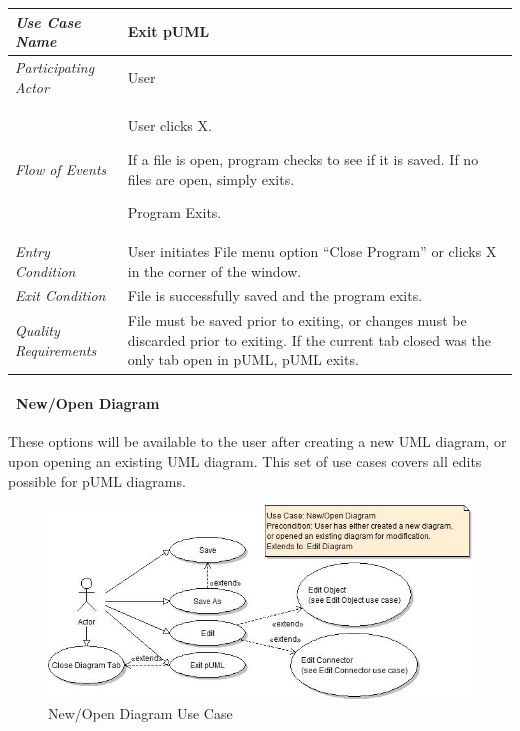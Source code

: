 \documentclass[twoside,letterpaper]{article}
\newenvironment{my_enumerate}{
\begin{enumerate}
  \setlength{\itemsep}{1pt}
  \setlength{\parskip}{0pt}
  \setlength{\parsep}{0pt}}{\end{enumerate}
}
\begin{document}
\begin{flushleft}
\tablehead{}
\begin{tabular}{|m{2.0in} m{5.0in}|}
\hline
{\bfseries\emph{Use Case Name}}
& {\bfseries Exit pUML}
\\\hline
\emph{Participating Actor}
& User
\\\hline
\emph{Flow of Events}
& \begin{my_enumerate}
\item User clicks X.
\item If a file is open, program checks to see if it is saved.  If no files are open, simply exits.
\item Program Exits.
\end{my_enumerate}
\\\hline
\emph{Entry Condition}
&
User initiates File menu option ``Close Program'' or clicks X in the corner of the window.
\\\hline
\emph{Exit Condition}
& File is successfully saved and the program exits.
\\\hline
\emph{Quality Requirements}
& File must be saved prior to exiting, or changes must be discarded prior to exiting. \newline
  If the current tab closed was the only tab open in pUML, pUML exits.
\\\hline
\end{tabular}
\end{flushleft}
\bigskip

\clearpage




\paragraph[\ New/Open Diagram]
{\ New/Open Diagram} {These options will be available to the user after creating a new UML diagram, or upon opening an existing UML diagram. This set of use cases covers all edits possible for pUML diagrams.}

\begin{figure}[h]
\centering
\includegraphics[width=6.0in]{ucaseNewOpenDiagram.jpg}
\caption{New/Open Diagram Use Case}
\end{figure}
\end{document}
